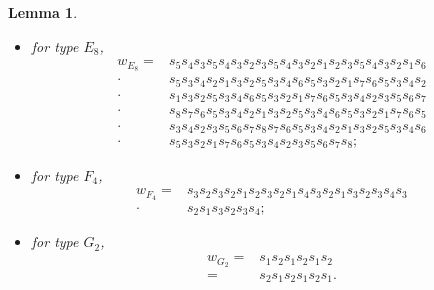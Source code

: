 \documentclass[11pt, reqno]{amsart}
\newtheorem{lem}[Thm]{Lemma}
\theoremstyle{definition}
\newtheorem{dfn}[Thm]{Definition}
\numberwithin{equation}{section}
\begin{document}
\begin{lem}
\begin{itemize}
        \item for type $E_8$, 
        \begin{align*}
w_{E_{8}}=&s_5s_{4}s_{3}s_5s_{4}s_{3}s_2 s_{3}s_5s_{4}s_{3} s_2s_1s_2 s_{3}s_5s_{4}s_3 
s_2s_{1}s_6\\
 \cdot & s_5s_3s_4s_2s_1s_3s_2s_5s_3s_4s_6s_5s_3s_2s_1 s_7s_6s_5s_3s_4s_2\\
 \cdot & s_1s_3s_2s_5s_3s_4s_6s_5s_3s_2s_1s_7s_6s_5s_3s_4s_2s_3s_5s_6s_7\\
 \cdot &  
 s_8s_7s_6s_5s_3s_4s_2s_1s_3s_2s_5s_3s_4s_6s_5s_3s_2s_1s_7s_6s_5\\ \cdot & s_3s_4s_2s_3s_5s_6s_7s_8s_7s_6s_5s_3s_4s_2s_1s_3s_2s_5s_3s_4s_6\\ \cdot &s_5s_3s_2s_1s_7s_6s_5s_3s_4s_2s_3s_5s_6s_7s_8;
      \end{align*}
\item for type $F_4$,
        \begin{align*}
 w_{F_4}=&s_3s_{2}s_{3}s_2 s_{1}s_{2}s_3 s_{2}s_1 s_{4}s_{3} s_2s_1 s_3s_2 s_{3} s_{4}s_3 \\
 \cdot &
s_2s_{1} s_3s_2s_3s_4;
        \end{align*}
\item for type $G_2$,
        \begin{align*}
 w_{G_2}=&s_1s_{2}s_{1}s_2 s_{1}s_{2}\\
 =&s_2s_1s_{2}s_{1}s_2 s_{1}.
        \end{align*}

      
    \end{itemize}
\end{lem}












\end{document}
